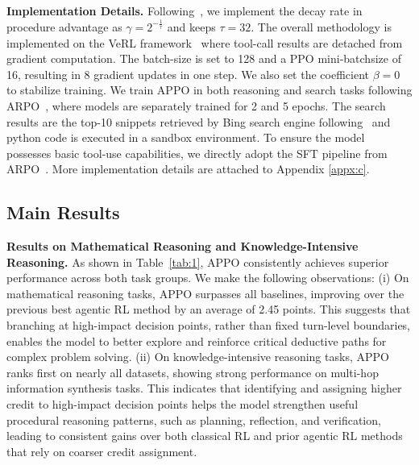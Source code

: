 \documentclass{llmxive}
\begin{document}
\noindent\textbf{Implementation Details.}  Following~\cite{ma2026fipo}, we implement the decay rate in procedure advantage as $\gamma=2^{-\frac{1}{\tau}}$ and keeps $\tau=32$. The overall methodology is implemented on the VeRL framework~\cite{sheng2025hybridflow} where tool-call results are detached from gradient computation.  The batch-size is set to 128 and a PPO mini-batchsize of 16, resulting in 8 gradient updates in one step. We also set the coefficient $\beta=0$ to stabilize training. We train APPO in both reasoning and search tasks following ARPO~\cite{dong2025agentic}, where models are separately trained for 2 and 5 epochs. The search results are the top-10 snippets retrieved by Bing search engine following~\cite{jin2025flashrag,li2025retrollm,dong2025tool} and python code is executed in a sandbox environment. To ensure the model possesses basic tool-use capabilities, we directly adopt the SFT pipeline from ARPO~\cite{dong2025agentic}. More implementation details are attached to Appendix \ref{appx:c}. 

\subsection{Main Results}
\noindent\textbf{Results on Mathematical Reasoning and Knowledge-Intensive Reasoning.} 
As shown in Table~\ref{tab:1}, APPO consistently achieves superior performance across both task groups. 
We make the following observations: 
(i) On mathematical reasoning tasks, APPO surpasses all baselines, improving over the previous best agentic RL method by an average of 2.45 points. This suggests that branching at high-impact decision points, rather than fixed turn-level boundaries, enables the model to better explore and reinforce critical deductive paths for complex problem solving. (ii) On knowledge-intensive reasoning tasks, APPO ranks first on nearly all datasets, showing strong performance on multi-hop information synthesis tasks. This indicates that identifying and assigning higher credit to high-impact decision points helps the model strengthen useful procedural reasoning patterns, such as planning, reflection, and verification, leading to consistent gains over both classical RL and prior agentic RL methods that rely on coarser credit assignment.
\end{document}
